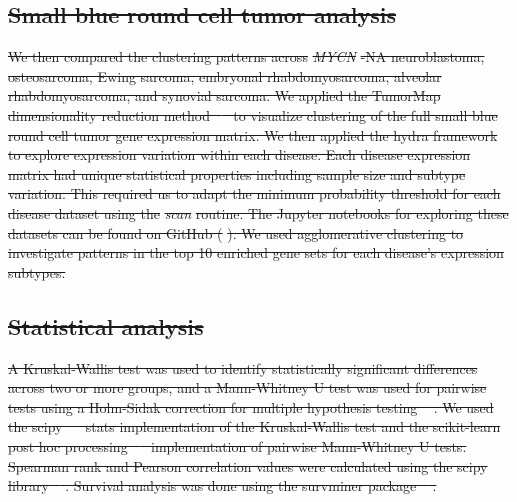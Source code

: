 \documentclass[10pt,letterpaper]{article}
\providecommand{\DIFdeltex}[1]{{\protect\color{red}\sout{#1}}}                      %
\providecommand{\DIFdel}[1]{\texorpdfstring{\DIFdeltex{#1}}{}} %
\begin{document}
\subsection*{\DIFdel{Small blue round cell tumor analysis}}
\DIFdel{We then compared the clustering patterns across }\textit{\DIFdel{MYCN}}%
\DIFdel{-NA neuroblastoma, osteosarcoma, Ewing sarcoma, embryonal rhabdomyosarcoma, alveolar rhabdomyosarcoma, and synovial sarcoma. We applied the TumorMap dimensionality reduction method \mbox{%
\cite{newtonTumorMapExploringMolecular2017} }\hspace{0pt}%
to visualize clustering of the full small blue round cell tumor gene expression matrix. We then applied the hydra framework to explore expression variation within each disease. Each disease expression matrix had unique statistical properties including sample size and subtype variation. This required us to adapt the minimum probability threshold for each disease dataset using the }\textit{\DIFdel{scan}} %
\DIFdel{routine. The Jupyter notebooks for exploring these datasets can be found on GitHub (}%
\DIFdel{). We used agglomerative clustering to investigate patterns in the top 10 enriched gene sets for each disease's expression subtypes.
}%

\subsection*{\DIFdel{Statistical analysis}}
\DIFdel{A Kruskal-Wallis test was used to identify statistically significant differences across two or more groups, and a Mann-Whitney U test was used for pairwise tests using a Holm-Sidak correction for multiple hypothesis testing \mbox{%
\cite{pedregosa2011scikit,jonesSciPyOpenSource2001}}\hspace{0pt}%
. We used the scipy \mbox{%
\cite{2019arXiv190710121V} }\hspace{0pt}%
stats implementation of the Kruskal-Wallis test and the scikit-learn post hoc processing \mbox{%
\cite{Terpilowski2019} }\hspace{0pt}%
implementation of pairwise Mann-Whitney U tests. Spearman rank and Pearson correlation values were calculated using the scipy library \mbox{%
\cite{jonesSciPyOpenSource2001}}\hspace{0pt}%
. Survival analysis was done using the survminer package \mbox{%
\cite{kassambaraSurvminerDrawingSurvival2019}}\hspace{0pt}%
.
}%
\end{document}
